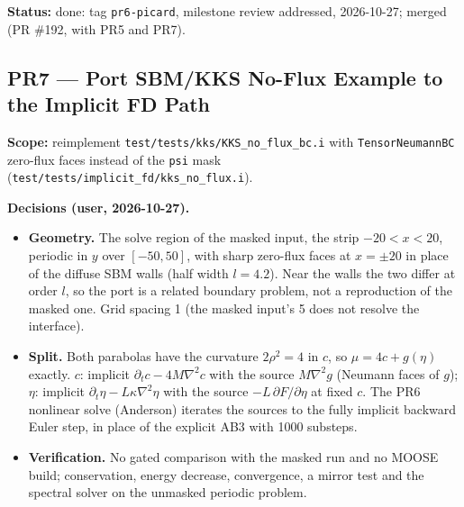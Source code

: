 \documentclass[11pt]{article}
\newcommand{\pr}[2]{\subsection{PR#1 --- #2}}
\newcommand{\status}[1]{\textcolor{marlinteal}{\textbf{Status:}} #1}
\begin{document}
\status{done: tag \texttt{pr6-picard}, milestone review addressed, 2026-10-27; merged (PR
\#192, with PR5 and PR7).}

\pr{7}{Port SBM/KKS No-Flux Example to the Implicit FD Path}
\textbf{Scope:} reimplement \texttt{test/tests/kks/KKS\_no\_flux\_bc.i} with
\texttt{TensorNeumannBC} zero-flux faces instead of the \texttt{psi} mask
(\texttt{test/tests/implicit\_fd/kks\_no\_flux.i}).

\textbf{Decisions (user, 2026-10-27).}
\begin{itemize}
  \item \textbf{Geometry.} The solve region of the masked input, the strip
    $-20 < x < 20$, periodic in $y$ over $[-50, 50]$, with sharp zero-flux faces at
    $x = \pm 20$ in place of the diffuse SBM walls (half width $l = 4.2$). Near the walls
    the two differ at order $l$, so the port is a related boundary problem, not a
    reproduction of the masked one. Grid spacing 1 (the masked input's 5 does not resolve
    the interface).
  \item \textbf{Split.} Both parabolas have the curvature $2\rho^2 = 4$ in $c$, so
    $\mu = 4c + g(\eta)$ exactly. $c$: implicit $\partial_t c - 4M\nabla^2 c$ with the
    source $M\nabla^2 g$ (Neumann faces of $g$); $\eta$: implicit
    $\partial_t\eta - L\kappa\nabla^2\eta$ with the source $-L\,\partial F/\partial\eta$ at
    fixed $c$. The PR6 nonlinear solve (Anderson) iterates the sources to the fully implicit
    backward Euler step, in place of the explicit AB3 with 1000 substeps.
  \item \textbf{Verification.} No gated comparison with the masked run and no MOOSE build;
    conservation, energy decrease, convergence, a mirror test and the spectral solver on
    the unmasked periodic problem.
\end{itemize}
\end{document}
